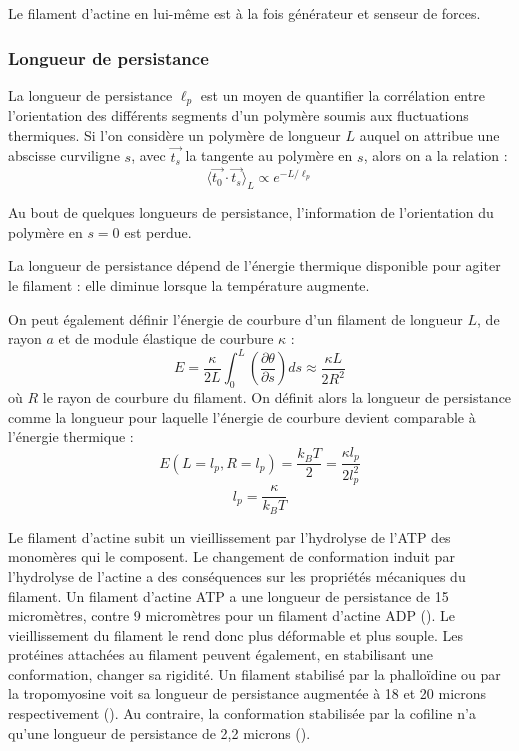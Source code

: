 \documentclass{report}
\begin{document}
Le filament d'actine en lui-même est à la fois générateur et senseur de forces. 

 \subsubsection{Longueur de persistance}
La longueur de persistance $\ell_p$ est un moyen de quantifier la corrélation entre l'orientation des différents segments d'un polymère soumis aux fluctuations thermiques. Si l'on considère un polymère de longueur $L$ auquel on attribue une abscisse curviligne $s$, avec $\vec{t_s}$ la tangente au polymère en $s$, alors on a la relation : 
$$ \langle \vec{t_0}\cdot \vec{t_s} \rangle_L \propto e^{-L/\ell_p}$$

Au bout de quelques longueurs de persistance, l'information de l'orientation du polymère en $s=0$ est perdue. 

La longueur de persistance dépend de l'énergie thermique disponible pour agiter le filament : elle diminue lorsque la température augmente. 

On peut également définir l'énergie de courbure d'un filament de longueur $L$, de rayon $a$ et de module élastique de courbure $\kappa$ : 
$$ E= \frac{\kappa}{2L} \int_0^L \left( \frac{\partial \theta}{\partial s} \right) ds \approx \frac{\kappa L}{2R^2}$$
 où $R$ le rayon de courbure du filament.  
 On définit alors la longueur de persistance comme la longueur pour laquelle l'énergie de courbure devient comparable à l'énergie thermique : 
 $$ E (L=l_p,R=l_p) = \frac{k_B T}{2} = \frac{\kappa l_p}{2 l_p^2}$$ 
 $$ l_p = \frac{\kappa}{k_B T}$$
 
 
Le filament d'actine subit un vieillissement par l'hydrolyse de l'ATP des monomères qui le composent. Le changement de conformation induit par l'hydrolyse de l'actine a des conséquences sur les propriétés mécaniques du filament. 
Un filament d'actine ATP a une longueur de persistance de 15 micromètres, contre 9 micromètres pour un filament d'actine ADP (\cite{isambert_flexibility_1995}). Le vieillissement du filament le rend donc plus déformable et plus souple. 
Les protéines attachées au filament peuvent également, en stabilisant une conformation, changer sa rigidité. Un filament stabilisé par la phalloïdine ou par la tropomyosine voit sa longueur de persistance augmentée à 18 et 20 microns respectivement (\cite{isambert_flexibility_1995}). Au contraire, la conformation stabilisée par la cofiline n'a qu'une longueur de persistance de 2,2 microns (\cite{mccullough_cofilin_2008}). 
\end{document}
